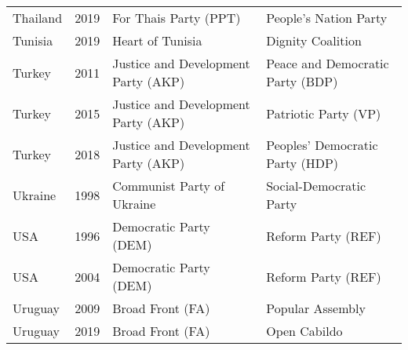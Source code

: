 {\begin{longtable}{|l|c|l|l|}
  Thailand & 2019 &   For Thais Party (PPT) &   People's Nation Party \\ 
  Tunisia & 2019 &   Heart of Tunisia &   Dignity Coalition \\ 
   Turkey & 2011 &   Justice and Development Party (AKP)&   Peace and Democratic Party (BDP)   \\ 
   Turkey & 2015 &   Justice and Development Party (AKP)  &   Patriotic Party (VP) \\ 
  Turkey & 2018 &   Justice and Development Party (AKP) &   Peoples' Democratic Party (HDP)   \\ 
  Ukraine & 1998 &   Communist Party of Ukraine &   Social-Democratic Party \\ 
USA & 1996 &   Democratic Party (DEM) &   Reform Party (REF) \\ 
USA& 2004 &   Democratic Party (DEM) &   Reform Party (REF) \\ 
Uruguay & 2009 &   Broad Front (FA) &   Popular Assembly \\ 
Uruguay & 2019 &   Broad Front (FA) &   Open Cabildo \\   \bottomrule
	\end{longtable} }